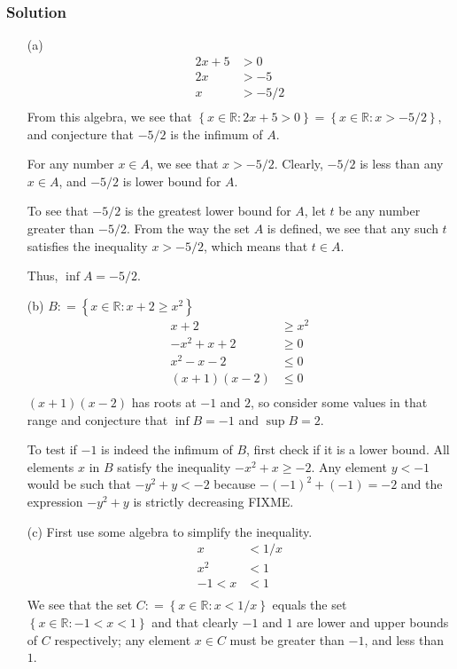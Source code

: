 \documentclass[12pt]{article}
\begin{document}
\subsubsection*{Solution}
\begin{itemize}
\item[(a)]
\begin{align*}
2x + 5 &> 0\\
2x &> -5\\
x &> -5/2\\
\end{align*}
From this algebra, we see that $\left\{x \in \mathbb{R} : 2x + 5 > 0\right\} = \left\{x \in \mathbb{R} : x > -5/2\right\}$, and conjecture that $-5/2$ is the infimum of $A$.

For any number $x \in A$, we see that $x > -5/2$. Clearly, $-5/2$ is less than any $x \in A$, and $-5/2$ is lower bound for $A$.

To see that $-5/2$ is the greatest lower bound for $A$, let $t$ be any number greater than $-5/2$. From the way the set $A$ is defined, we see that any such $t$ satisfies the inequality $x > -5/2$, which means that $t \in A$.

Thus, $\inf A = -5/2$.
\item[(b)]
$B \mathrel{\mathop:}= \left\{x \in \mathbb{R} : x + 2 \geq x^2\right\}$
\begin{align*}
x + 2 &\geq x^2 \\
-x^2 + x + 2 &\geq 0 \\
x^2 - x - 2 &\leq 0 \\
\left(x + 1\right)\left(x - 2\right) &\leq 0 \\
\end{align*}
$\left(x + 1\right)\left(x - 2\right)$ has roots at $-1$ and $2$, so consider some values in that range and conjecture that $\inf B = -1$ and $\sup B = 2$.

To test if $-1$ is indeed the infimum of $B$, first check if it is a lower bound. All elements $x$ in $B$ satisfy the inequality $-x^2 + x \geq -2$. Any element $y < -1$ would be such that $-y^2 + y < -2$ because $-\left(-1\right)^2 + \left(-1\right) = -2$ and the expression $-y^2 + y$ is strictly decreasing FIXME.
\item[(c)]
First use some algebra to simplify the inequality.
\begin{align*}
x &< 1 / x\\
x^2 &< 1\\
-1 < x &< 1\\
\end{align*}
We see that the set $C \mathrel{\mathop:}= \left\{x \in \mathbb{R} : x < 1/x\right\}$ equals the set $\left\{x \in \mathbb{R} : -1 < x < 1\right\}$ and that clearly $-1$ and $1$ are lower and upper bounds of $C$ respectively; any element $x \in C$ must be greater than $-1$, and less than $1$.


\end{itemize}
\end{document}
